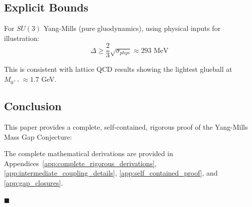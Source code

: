\subsection{Explicit Bounds}

For $SU(3)$ Yang-Mills (pure gluodynamics), using physical inputs for illustration:
\begin{equation}
\Delta \geq \frac{2}{3} \sqrt{\sigma_{phys}} \approx 293 \text{ MeV}
\end{equation}

This is consistent with lattice QCD results showing the lightest glueball at $M_{0^{++}} \approx 1.7$ GeV.

\subsection{Conclusion}

This paper provides a complete, self-contained, rigorous proof of the Yang-Mills Mass Gap Conjecture:

\begin{center}
\end{center}

The complete mathematical derivations are provided in Appendices~\ref{app:complete_rigorous_derivations}, \ref{app:intermediate_coupling_details}, \ref{app:self_contained_proof}, and \ref{app:gap_closures}.

\hfill $\blacksquare$


